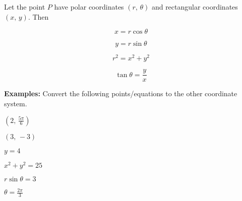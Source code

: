 \documentclass[addpoints, 12pt]{exam}
\begin{document}
\begin{tcolorbox}[title= COORDINATE CONVERSION EQUATIONS ,colframe=black,sharp corners,colback=white,colbacktitle=white,coltitle=black]

    

    Let the point $P$ have polar coordinates $(r,\,\theta)$ and rectangular coordinates $(x,\,y)$. Then
    \begin{minipage}[t]{.45\linewidth}
        \[x=r\cos \theta\]
    \end{minipage}
    \hfill
    \begin{minipage}[t]{.45\linewidth}
        \[y=r\sin \theta\]
    \end{minipage}
    
    \begin{minipage}[t]{.45\linewidth}
        \[r^2=x^2+y^2\]
    \end{minipage}
    \hfill
    \begin{minipage}[t]{.45\linewidth}
        \[\tan\theta=\frac{y}{x}\]
    \end{minipage}
    
\end{tcolorbox}
\vspace{.1cm}
\noindent\textbf{Examples:} Convert the following points/equations to the other coordinate system.
\begin{questions}
    \begin{minipage}{.45\linewidth}
        \question $\displaystyle\left(2,\,\frac{5\pi}{6}\right)$
    \end{minipage}
    \hfill
    \begin{minipage}{0.45\linewidth}
        \question $\displaystyle (3,\,-3)$
    \end{minipage}
    
    \newpage
    
    \begin{minipage}{0.45\linewidth}
        \question $y=4$
    \end{minipage}
    \hfill
    \begin{minipage}{0.45\linewidth}
        \question $x^2+y^2=25$
    \end{minipage}
    
    
    \begin{minipage}{0.45\linewidth}
        \question $r\sin\theta=3$
    \end{minipage}
    \hfill
    \begin{minipage}{0.45\linewidth}
        \question $\displaystyle\theta=\frac{2\pi}{3}$
    \end{minipage}

    
\end{questions}
\end{document}

